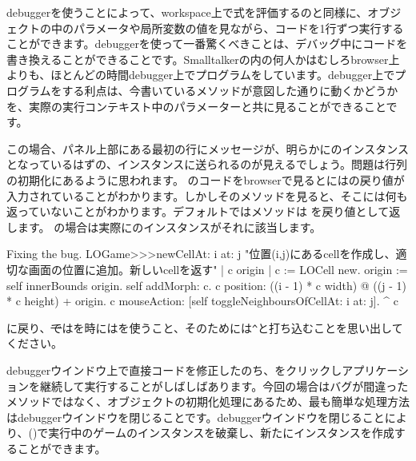 \documentclass[a4paper,10pt,twoside]{book}
\begin{document}
debuggerを使うことによって、workspace上で式を評価するのと同様に、オブジェクトの中のパラメータや局所変数の値を見ながら、コードを1行ずつ実行することができます。debuggerを使って一番驚くべきことは、デバッグ中にコードを書き換えることができることです。Smalltalkerの内の何人かはむしろbrowser上よりも、ほとんどの時間debugger上でプログラムをしています。debugger上でプログラムをする利点は、今書いているメソッドが意図した通りに動くかどうかを、実際の実行コンテキスト中のパラメーターと共に見ることができることです。

この場合、パネル上部にある最初の行にメッセージが、明らかにのインスタンスとなっているはずの、インスタンスに送られるのが見えるでしょう。問題は行列の初期化にあるように思われます。
のコードをbrowserで見るとにはの戻り値が入力されていることがわかります。しかしそのメソッドを見ると、そこには何も返っていないことがわかります。デフォルトではメソッドは を戻り値として返します。  の場合は実際にのインスタンスがそれに該当します。

\dothis{debuggerウインドウを閉じで下さい。
その後\ct{c}を返すために、``\ct{^ c}''式を \ct{LOGame>>>newCellAt:at:}メソッドの最後に追加して下さい。
(\mthref{newCellAt:at:nobug}参照。)}

\begin{method}{Fixing the bug.}
LOGame>>>newCellAt: i at: j
   "位置(i,j)にあるcellを作成し、適切な画面の位置に追加。新しいcellを返す"
   | c origin |
   c := LOCell new.
   origin := self innerBounds origin.
   self addMorph: c.
   c position: ((i - 1) * c width) @ ((j - 1) * c height) + origin.
   c mouseAction: [self toggleNeighboursOfCellAt: i at: j].
   ^ c
\end{method}

\noindent
{}に戻り、\st ではを時には\ct{^}を使うこと、そのためには\verb|^|と打ち込むことを思い出してください。

debuggerウインドウ上で直接コードを修正したのち、をクリックしアプリケーションを継続して実行することがしばしばあります。今回の場合はバグが間違ったメソッドではなく、オブジェクトの初期化処理にあるため、最も簡単な処理方法はdebuggerウインドウを閉じることです。debuggerウインドウを閉じることにより、()で実行中のゲームのインスタンスを破棄し、新たにインスタンスを作成することができます。
\end{document}
